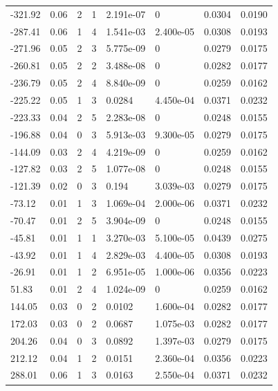 \documentclass[preview]{standalone}
\begin{document}
{{\begin{tabular}{L{1.2cm}C{1.2cm} C{0.3cm}C{0.5cm} C{1.4cm}C{1.4cm} C{1.4cm}C{1.4cm}}
  -321.92  &  0.06  & 2     &  1 &  2.191e-07  & 0  & 0.0304 &  0.0190   \\ 
  -287.41  &  0.06  & 1     &  4 &  1.541e-03  & 2.400e-05  & 0.0308 &  0.0193   \\ 
  -271.96  &  0.05  & 2     &  3 &  5.775e-09  & 0  & 0.0279 &  0.0175   \\ 
  -260.81  &  0.05  & 2     &  2 &  3.488e-08  & 0  & 0.0282 &  0.0177   \\ 
  -236.79  &  0.05  & 2     &  4 &  8.840e-09  & 0  & 0.0259 &  0.0162   \\ 
  -225.22  &  0.05  & 1     &  3 &  0.0284  & 4.450e-04  & 0.0371 &  0.0232   \\ 
  -223.33  &  0.04  & 2     &  5 &  2.283e-08  & 0  & 0.0248 &  0.0155   \\ 
  -196.88  &  0.04  & 0     &  3 &  5.913e-03  & 9.300e-05  & 0.0279 &  0.0175   \\ 
  -144.09  &  0.03  & 2     &  4 &  4.219e-09  & 0  & 0.0259 &  0.0162   \\ 
  -127.82  &  0.03  & 2     &  5 &  1.077e-08  & 0  & 0.0248 &  0.0155   \\ 
  -121.39  &  0.02  & 0     &  3 &  0.194  & 3.039e-03  & 0.0279 &  0.0175   \\ 
  -73.12  &  0.01  & 1     &  3 &  1.069e-04  & 2.000e-06  & 0.0371 &  0.0232   \\ 
  -70.47  &  0.01  & 2     &  5 &  3.904e-09  & 0  & 0.0248 &  0.0155   \\ 
  -45.81  &  0.01  & 1     &  1 &  3.270e-03  & 5.100e-05  & 0.0439 &  0.0275   \\ 
  -43.92  &  0.01  & 1     &  4 &  2.829e-03  & 4.400e-05  & 0.0308 &  0.0193   \\ 
  -26.91  &  0.01  & 1     &  2 &  6.951e-05  & 1.000e-06  & 0.0356 &  0.0223   \\ 
  51.83  &  0.01  & 2     &  4 &  1.024e-09  & 0  & 0.0259 &  0.0162   \\ 
  144.05  &  0.03  & 0     &  2 &  0.0102  & 1.600e-04  & 0.0282 &  0.0177   \\ 
  172.03  &  0.03  & 0     &  2 &  0.0687  & 1.075e-03  & 0.0282 &  0.0177   \\ 
  204.26  &  0.04  & 0     &  3 &  0.0892  & 1.397e-03  & 0.0279 &  0.0175   \\ 
  212.12  &  0.04  & 1     &  2 &  0.0151  & 2.360e-04  & 0.0356 &  0.0223   \\ 
  288.01  &  0.06  & 1     &  3 &  0.0163  & 2.550e-04  & 0.0371 &  0.0232   \\ 

\end{tabular}}}
\end{document}
